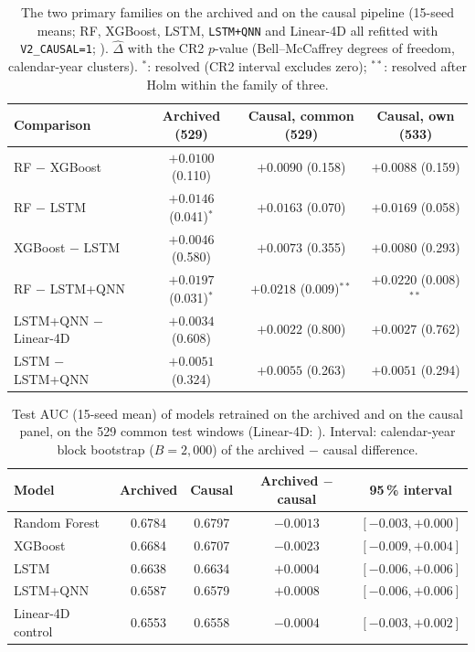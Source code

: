 \documentclass[11pt,a4paper]{article}
\begin{document}
\begin{table}[htbp]
\centering
\caption{The two primary families on the archived and on the causal pipeline (15-seed means; RF, XGBoost, LSTM, \texttt{LSTM+QNN} and Linear-4D all refitted with \texttt{V2\_CAUSAL=1}; \protect{}). $\hat\Delta$ with the CR2 $p$-value (Bell--McCaffrey degrees of freedom, calendar-year clusters). $^{*}$: resolved (CR2 interval excludes zero); $^{**}$: resolved after Holm within the family of three.}
\label{tab:causal}
{\small
\begin{tabular}{lccc}
\toprule
Comparison & Archived (529) & Causal, common (529) & Causal, own (533) \\
\midrule
RF $-$ XGBoost & $+0.0100$ (0.110) & $+0.0090$ (0.158) & $+0.0088$ (0.159) \\
RF $-$ LSTM & $+0.0146$ (0.041)$^{*}$ & $+0.0163$ (0.070) & $+0.0169$ (0.058) \\
XGBoost $-$ LSTM & $+0.0046$ (0.580) & $+0.0073$ (0.355) & $+0.0080$ (0.293) \\
\midrule
RF $-$ LSTM+QNN & $+0.0197$ (0.031)$^{*}$ & $+0.0218$ (0.009)$^{**}$ & $+0.0220$ (0.008)$^{**}$ \\
LSTM+QNN $-$ Linear-4D & $+0.0034$ (0.608) & $+0.0022$ (0.800) & $+0.0027$ (0.762) \\
LSTM $-$ LSTM+QNN & $+0.0051$ (0.324) & $+0.0055$ (0.263) & $+0.0051$ (0.294) \\
\bottomrule
\end{tabular}}
\end{table}

\begin{table}[htbp]
\centering
\caption{Test AUC (15-seed mean) of models retrained on the archived and on the causal panel, on the 529 common test windows (Linear-4D: \protect{}). Interval: calendar-year block bootstrap ($B=2{,}000$) of the archived $-$ causal difference.}
\label{tab:lookahead}
{\small
\begin{tabular}{lcccc}
\toprule
Model & Archived & Causal & Archived $-$ causal & 95\,\% interval \\
\midrule
Random Forest & 0.6784 & 0.6797 & $-0.0013$ & $[-0.003,+0.000]$ \\
XGBoost & 0.6684 & 0.6707 & $-0.0023$ & $[-0.009,+0.004]$ \\
LSTM & 0.6638 & 0.6634 & $+0.0004$ & $[-0.006,+0.006]$ \\
LSTM+QNN & 0.6587 & 0.6579 & $+0.0008$ & $[-0.006,+0.006]$ \\
Linear-4D control & 0.6553 & 0.6558 & $-0.0004$ & $[-0.003,+0.002]$ \\
\bottomrule
\end{tabular}}
\end{table}
\end{document}
